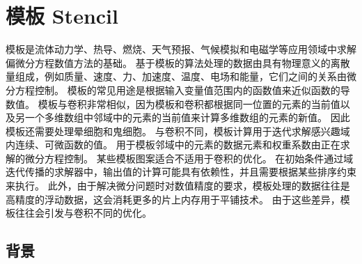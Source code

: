 \section{模板 Stencil}
模板是流体动力学、热导、燃烧、天气预报、气候模拟和电磁学等应用领域中求解偏微分方程数值方法的基础。 基于模板的算法处理的数据由具有物理意义的离散量组成，例如质量、速度、力、加速度、温度、电场和能量，它们之间的关系由微分方程控制。 模板的常见用途是根据输入变量值范围内的函数值来近似函数的导数值。 模板与卷积非常相似，因为模板和卷积都根据同一位置的元素的当前值以及另一个多维数组中邻域中的元素的当前值来计算多维数组的元素的新值。 因此模板还需要处理晕细胞和鬼细胞。 与卷积不同，模板计算用于迭代求解感兴趣域内连续、可微函数的值。 用于模板邻域中的元素的数据元素和权重系数由正在求解的微分方程控制。 某些模板图案适合不适用于卷积的优化。 在初始条件通过域迭代传播的求解器中，输出值的计算可能具有依赖性，并且需要根据某些排序约束来执行。 此外，由于解决微分问题时对数值精度的要求，模板处理的数据往往是高精度的浮动数据，这会消耗更多的片上内存用于平铺技术。 由于这些差异，模板往往会引发与卷积不同的优化。

\subsection{背景}